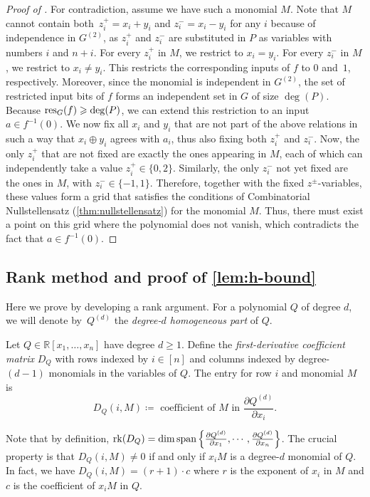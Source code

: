 \documentclass{article}
\begin{document}
\begin{proof}[Proof of ]
    For contradiction, assume we have such a monomial $M$. Note that $M$ cannot contain both~$z^+_i=x_i+y_i$ and $z^-_i=x_i-y_i$ for any $i$ because of independence in $G^{(2)}$, as $z^+_i$ and $z^-_i$ are substituted in $P$ as variables with numbers $i$ and $n + i$. For every $z^+_i$ in $M$, we restrict to $x_i = y_i$. For every $z^-_i$ in $M$, we restrict to $x_i \neq y_i$. This restricts the corresponding inputs of $f$ to $0$ and~$1$, respectively. Moreover, since the monomial is independent in $G^{(2)}$, the set of restricted input bits of $f$ forms an independent set in $G$ of size $\deg(P)$. Because $\operatorname{res}_G(f) \geqslant \deg(P)$, we can extend this restriction to an input $a \in f^{-1}(0)$. We now fix all $x_i$ and $y_i$ that are not part of the above relations in such a way that $x_i \oplus y_i$ agrees with $a_i$, thus also fixing both $z^+_i$ and $z^-_i$. Now, the only $z^+_i$ that are not fixed are exactly the ones appearing in $M$, each of which can independently take a value $z^+_i\in \{0,2\}$. Similarly, the only $z^-_i$ not yet fixed are the ones in $M$, with $z^-_i \in \{-1, 1\}$. Therefore, together with the fixed $z^{\pm}$-variables, these values form a grid that satisfies the conditions of Combinatorial Nullstellensatz (\cref{thm:nullstellensatz}) for the monomial $M$. Thus, there must exist a point on this grid where the polynomial does not vanish, which contradicts the fact that $a \in f^{-1}(0)$.
\end{proof}



\subsection{Rank method and proof of \cref{lem:h-bound}} \label{sec:rank-method}

Here we prove   by developing a rank argument. For a polynomial $Q$ of degree $d$, we will denote by~$Q^{(d)}$ the \emph{degree-$d$ homogeneous part} of $Q$.
  
\begin{boxdefinition}\label{def:derivative-matrix}
    Let $Q \in \mathbb{R}[x_1,\dots,x_n]$ have degree $d\geq 1$. Define the \emph{first-derivative coefficient matrix} $D_Q$ with rows indexed by $i\in [n]$ and columns indexed by degree-$(d-1)$ monomials in the variables of $Q$.
    The entry for row $i$ and monomial $M$ is 
    \[
        D_Q(i,M)\coloneqq \text{ coefficient of } M \text{ in } \frac{\partial Q^{(d)}}{\partial x_i}.
    \]
\end{boxdefinition}
    Note that by definition, $\operatorname{rk}(D_Q) = \dim \mathrm{span}\left\{ \frac{\partial Q^{(d)}}{\partial x_1},\cdots, \frac{\partial Q^{(d)}}{\partial x_n}  \right\}$.
The crucial property is that 
$D_Q(i,M)\neq 0$ if and only if $x_iM$ is a degree-$d$ monomial of $Q$. In fact, we have $D_Q(i,M) = (r+1)\cdot c$ where $r$ is the exponent of $x_i$ in $M$ and $c$ is the coefficient of $x_iM$ in $Q$.
\end{document}
